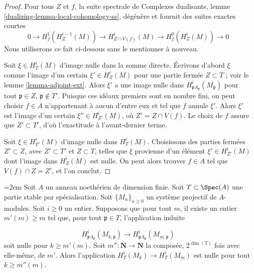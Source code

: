 \begin{proof}
Pour tous $Z$ et $f$, la suite spectrale de Complexes dualisants, lemme \ref{dualizing-lemma-local-cohomology-ss}, dégénère et fournit des suites exactes courtes
$$
0 \to H^1_f(H^{i - 1}_Z(M)) \to
H^i_{Z \cap V(f)}(M) \to H^0_f(H^i_Z(M)) \to 0
$$
Nous utiliserons ce fait ci-dessous sans le mentionner à nouveau.

\medskip\noindent
Soit $\xi \in H^i_T(M)$ d'image nulle dans la somme directe. Écrivons d'abord $\xi$ comme l'image d'un certain $\xi' \in H^i_Z(M)$ pour une partie fermée $Z \subset T$ ; voir le lemme \ref{lemma-adjoint-ext}. Alors $\xi'$ a une image nulle dans $H^i_{\mathfrak p A_\mathfrak p}(M_\mathfrak p)$ pour tout $\mathfrak p \in Z$, $\mathfrak p \not \in T'$. Puisque ces idéaux premiers sont en nombre fini, on peut choisir $f \in A$ n'appartenant à aucun d'entre eux et tel que $f$ annule $\xi'$. Alors $\xi'$ est l'image d'un certain $\xi'' \in H^i_{Z'}(M)$, où $Z' = Z \cap V(f)$. Le choix de $f$ assure que $Z' \subset T'$, d'où l'exactitude à l'avant-dernier terme.

\medskip\noindent
Soit $\xi \in H^i_{T'}(M)$ d'image nulle dans $H^i_T(M)$. Choisissons des parties fermées $Z' \subset Z$, avec $Z' \subset T'$ et $Z \subset T$, telles que $\xi$ provienne d'un élément $\xi' \in H^i_{Z'}(M)$ dont l'image dans $H^i_Z(M)$ est nulle. On peut alors trouver $f \in A$ tel que $V(f) \cap Z = Z'$, et l'on conclut.
\end{proof}

\begin{lemma}
\label{lemma-zero}
{\emergencystretch=2em
Soit $A$ un anneau noethérien de dimension finie. Soit $T \subset \Spec(A)$ une partie stable par spécialisation. Soit $\{M_n\}_{n \geq 0}$ un système projectif de $A$-modules. Soit $i \geq 0$ un entier. Supposons que pour tout $m$, il existe un entier $m'(m) \geq m$ tel que, pour tout $\mathfrak p \in T$, l'application induite
\par}
$$
H^i_{\mathfrak p A_\mathfrak p}(M_{k, \mathfrak p})
\longrightarrow
H^i_{\mathfrak p A_\mathfrak p}(M_{m, \mathfrak p})
$$
soit nulle pour $k \geq m'(m)$. Soit $m'' : \mathbf{N} \to \mathbf{N}$ la composée, $2^{\dim(T)}$ fois avec elle-même, de $m'$. Alors l'application $H^i_T(M_k) \to H^i_T(M_m)$ est nulle pour tout $k \geq m''(m)$.
\end{lemma}


